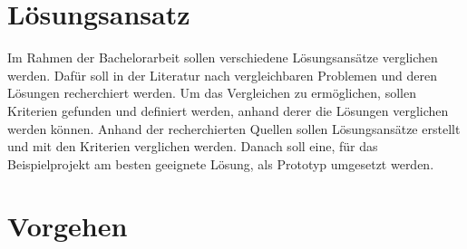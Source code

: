 \section{Lösungsansatz}\label{sec:loesungsansatz}

Im Rahmen der Bachelorarbeit sollen verschiedene Lösungsansätze verglichen werden.
Dafür soll in der Literatur nach vergleichbaren Problemen und deren Lösungen recherchiert werden.
Um das Vergleichen zu ermöglichen, sollen Kriterien gefunden und definiert werden, anhand derer die Lösungen verglichen werden können.
Anhand der recherchierten Quellen sollen Lösungsansätze erstellt und mit den Kriterien verglichen werden.
Danach soll eine, für das Beispielprojekt am besten geeignete Lösung, als Prototyp umgesetzt werden.

\section{Vorgehen}\label{sec:vorgehen}


